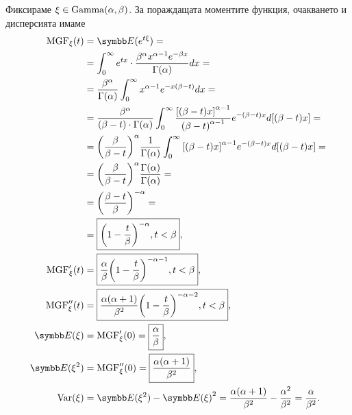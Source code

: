 \documentclass[
  headings=standardclasses,
  bibliography=totocnumbered,
]{scrartcl}
\begin{document}
Фиксираме \( \xi \in \operatorname{Gamma}(\alpha, \beta) \). За пораждащата моментите функция, очакването и дисперсията имаме
\begingroup
\allowdisplaybreaks
\begin{align*}
  \MGF_\xi(t)
  &=
  \Expect(e^{t\xi})
  = \\ &=
  \int_0^\infty e^{tx} \cdot \frac {\beta^\alpha x^{\alpha-1} e^{-\beta x}} {\Gamma(\alpha)} dx
  = \\ &=
  \frac {\beta^\alpha} {\Gamma(\alpha)} \int_0^\infty x^{\alpha-1} e^{-x(\beta-t)} dx
  = \\ &=
  \frac {\beta^\alpha} {(\beta-t) \cdot \Gamma(\alpha)} \int_0^\infty \frac {{[(\beta-t)x]}^{\alpha-1}} {{(\beta-t)}^{\alpha-1}} e^{-(\beta-t)x} d[(\beta-t)x]
  = \\ &=
  {\left(\frac \beta {\beta-t} \right)}^\alpha \frac 1 {\Gamma(\alpha)} \int_0^\infty {[(\beta-t)x]}^{\alpha-1} e^{-(\beta-t)x} d[(\beta-t)x]
  = \\ &=
  {\left(\frac \beta {\beta-t} \right)}^\alpha \frac {\Gamma(\alpha)} {\Gamma(\alpha)}
  = \\ &=
  {\left(\frac {\beta-t} \beta \right)}^{-\alpha}
  = \\ &=
  \boxed{{\left(1 - \frac t \beta \right)}^{-\alpha}, t < \beta},
  \\
  \MGF'_\xi(t)
  &=
  \boxed{\frac \alpha \beta {\left(1 - \frac t \beta \right)}^{-\alpha-1}, t < \beta},
  \\
  \MGF''_\xi(t)
  &=
  \boxed{\frac {\alpha(\alpha+1)} {\beta^2} {\left(1 - \frac t \beta \right)}^{-\alpha-2}, t < \beta},
  \\
  \Expect(\xi)
  &=
  \MGF'_\xi(0)
  =
  \boxed{\frac \alpha \beta},
  \\
  \Expect(\xi^2)
  &=
  \MGF''_\xi(0)
  =
  \boxed{\frac {\alpha(\alpha+1)} {\beta^2}},
  \\
  \Var(\xi)
  &=
  \Expect(\xi^2) - {\Expect(\xi)}^2
  =
  \frac {\alpha(\alpha+1)} {\beta^2} - \frac {\alpha^2} {\beta^2}
  =
  \frac \alpha {\beta^2}.
\end{align*}
\endgroup
\end{document}
